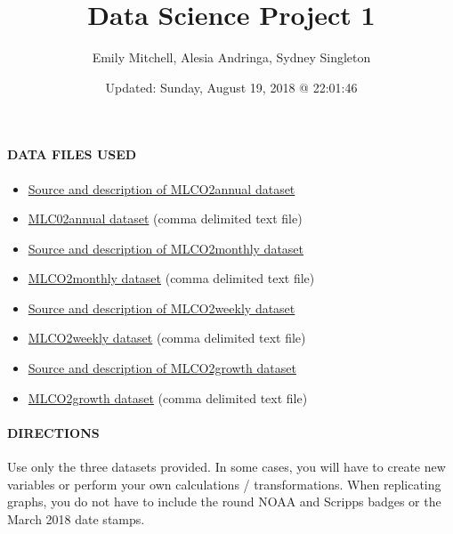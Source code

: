 \documentclass[]{article}
\title{Data Science Project 1}
\author{Emily Mitchell, Alesia Andringa, Sydney Singleton}
\date{Updated: Sunday, August 19, 2018 @ 22:01:46}
\let\oldparagraph\paragraph
\renewcommand{\paragraph}[1]{\oldparagraph{#1}\mbox{}}
\begin{document}
\maketitle

\paragraph{DATA FILES USED}\label{data-files-used}

\begin{itemize}
\item
  \href{ftp://aftp.cmdl.noaa.gov/products/trends/co2/co2_annmean_mlo.txt}{Source
  and description of MLCO2annual dataset}
\item
  \href{https://raw.githubusercontent.com/STAT-JET-ASU/DataScience1/master/Projects/MLCO2annual.csv}{MLC02annual
  dataset} (comma delimited text file)
\item
  \href{ftp://aftp.cmdl.noaa.gov/products/trends/co2/co2_mm_mlo.txt}{Source
  and description of MLCO2monthly dataset}
\item
  \href{https://raw.githubusercontent.com/STAT-JET-ASU/DataScience1/master/Projects/MLCO2monthly.csv}{MLCO2monthly
  dataset} (comma delimited text file)
\item
  \href{ftp://aftp.cmdl.noaa.gov/products/trends/co2/co2_weekly_mlo.txt}{Source
  and description of MLCO2weekly dataset}
\item
  \href{https://raw.githubusercontent.com/STAT-JET-ASU/DataScience1/master/Projects/MLCO2weekly.csv}{MLCO2weekly
  dataset} (comma delimited text file)
\item
  \href{https://www.esrl.noaa.gov/gmd/ccgg/trends/gr.html}{Source and
  description of MLCO2growth dataset}
\item
  \href{https://raw.githubusercontent.com/STAT-JET-ASU/DataScience1/master/Projects/MLCO2growth.csv}{MLCO2growth
  dataset} (comma delimited text file)
\end{itemize}

\paragraph{DIRECTIONS}\label{directions}

Use only the three datasets provided. In some cases, you will have to
create new variables or perform your own calculations / transformations.
When replicating graphs, you do not have to include the round NOAA and
Scripps badges or the March 2018 date stamps.
\end{document}
